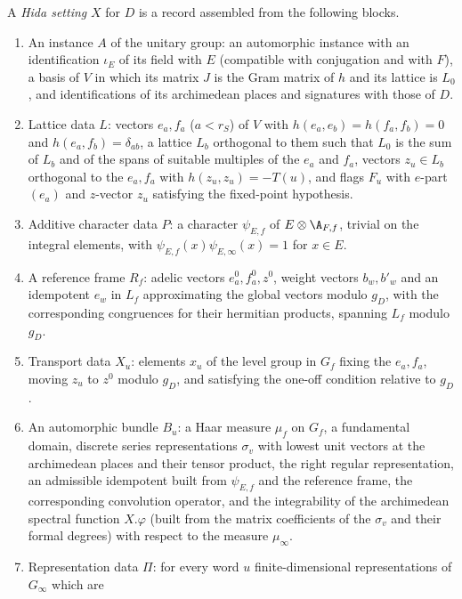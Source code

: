\begin{definition}\label{pf:baselat1:def:hida}
A \emph{Hida setting} $X$ for $D$ is a record assembled from the following blocks.
\begin{enumerate}[label=(\alph*)]
\item An instance $A$ of the unitary group: an automorphic instance with an identification $\iota_E$ of its field with
  $E$ (compatible with conjugation and with $F$), a basis of $V$ in which its matrix $J$ is the Gram matrix of $h$ and
  its lattice is $L_0$, and identifications of its archimedean places and signatures with those of $D$.
\item Lattice data $L$: vectors $e_a,f_a$ ($a<r_S$) of $V$ with $h(e_a,e_b)=h(f_a,f_b)=0$ and $h(e_a,f_b)=\delta_{ab}$, a
  lattice $L_b$ orthogonal to them such that $L_0$ is the sum of $L_b$ and of the spans of suitable multiples of the
  $e_a$ and $f_a$, vectors $z_u\in L_b$ orthogonal to the $e_a,f_a$ with $h(z_u,z_u)=-T(u)$, and flags $F_u$ with
  $e$-part $(e_a)$ and $z$-vector $z_u$ satisfying the fixed-point hypothesis.
\item Additive character data $P$: a character $\psi_{E,f}$ of $E\otimes\A_{F,f}$, trivial on the integral
  elements, with $\psi_{E,f}(x)\psi_{E,\infty}(x)=1$ for $x\in E$.
\item A reference frame $R_f$: adelic vectors $e_a^0,f_a^0,z^0$, weight vectors $b_w,b'_w$ and an idempotent $e_w$ in
  $L_f$ approximating the global vectors modulo $g_D$, with the corresponding congruences for their hermitian
  products, spanning $L_f$ modulo $g_D$.
\item Transport data $X_u$: elements $x_u$ of the level group in $G_f$ fixing the $e_a,f_a$, moving $z_u$ to
  $z^0$ modulo $g_D$, and satisfying the one-off condition relative to $g_D$.
\item An automorphic bundle $B_u$: a Haar measure $\mu_f$ on $G_f$, a fundamental domain, discrete series
  representations $\sigma_v$ with lowest unit vectors at the archimedean places and their tensor product, the right
  regular representation, an admissible idempotent built from $\psi_{E,f}$ and the reference frame, the
  corresponding convolution operator, and the integrability of the archimedean spectral function $X.\varphi$
  (built from the matrix coefficients of the $\sigma_v$ and their formal degrees) with respect to the measure
  $\mu_\infty$.
\item Representation data $\Pi$: for every word $u$ finite-dimensional representations of $G_\infty$ which are

\end{enumerate}
\end{definition}
